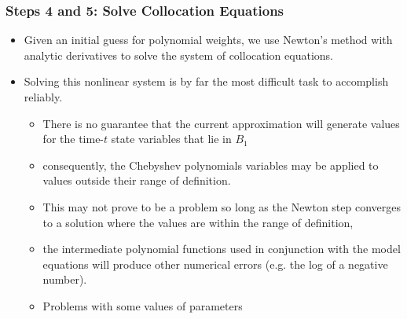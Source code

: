 \documentclass[handout]{beamer}
\begin{document}
\begin{frame}

\frametitle{Steps 4 and 5: Solve Collocation Equations}
\begin{itemize}
\item Given an initial guess for polynomial weights, we use Newton's
  method with analytic derivatives to solve the system of collocation
  equations.
\item Solving this nonlinear system is by far the most difficult task
  to accomplish reliably.
  \begin{itemize}
  \item There is no guarantee that the current approximation will
    generate values for the time-$t$ state variables that lie in
    $B_{1}$
  \item consequently, the Chebyshev polynomials variables may be
    applied to values outside their range of definition.
  \item This may not prove to be a problem so long as the Newton step
    converges to a solution where the values are within the range of
    definition,
  \item the intermediate polynomial functions used %
    {in conjunction} with the model equations will produce other
    numerical errors (e.g. the log of a negative number).
  \item {Problems with some values of parameters}
  \end{itemize}
\end{itemize}



\end{frame}
\end{document}
